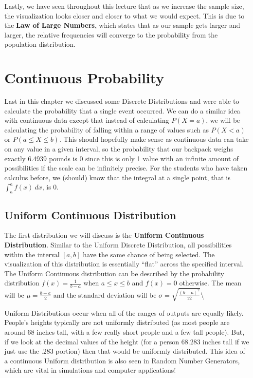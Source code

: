 \documentclass[
  letterpaper,
  DIV=11,
  numbers=noendperiod]{scrreprt}
\begin{document}
Lastly, we have seen throughout this lecture that as we increase the
sample size, the visualization looks closer and closer to what we would
expect. This is due to the \textbf{Law of Large Numbers}, which states
that as our sample gets larger and larger, the relative frequencies will
converge to the probability from the population distribution.

\section{Continuous Probability}\label{continuous-probability}

Last in this chapter we discussed some Discrete Distributions and were
able to calculate the probability that a single event occurred. We can
do a similar idea with continuous data except that instead of
calculating \(P(X=a)\), we will be calculating the probability of
falling within a range of values such as \(P(X<a)\) or
\(P(a\leq X \leq b)\). This should hopefully make sense as continuous
data can take on any value in a given interval, so the probability that
our backpack weighs exactly 6.4939 pounds is 0 since this is only 1
value with an infinite amount of possibilities if the scale can be
infinitely precise. For the students who have taken calculus before, we
(should) know that the integral at a single point, that is
\(\int_a^a f(x)\ dx\), is 0.

\subsection{Uniform Continuous
Distribution}\label{uniform-continuous-distribution}

The first distribution we will discuss is the \textbf{Uniform Continuous
Distribution}. Similar to the Uniform Discrete Distribution, all
possibilities within the interval \([a,b]\) have the same chance of
being selected. The visualization of this distribution is essentially
``flat'' across the specified interval. The Uniform Continuous
distribution can be described by the probability distribution
\(f(x)=\frac{1}{b-a}\) when \(a\leq x \leq b\) and \(f(x)=0\) otherwise.
The mean will be \(\mu=\frac{b+a}{2}\) and the standard deviation will
be \(\sigma = \sqrt{\frac{(b-a)^2}{12}}\)\textbackslash{}

Uniform Distributions occur when all of the ranges of outputs are
equally likely. People's heights typically are not uniformly distributed
(as most people are around 68 inches tall, with a few really short
people and a few tall people). But, if we look at the decimal values of
the height (for a person 68.283 inches tall if we just use the .283
portion) then that would be uniformly distributed. This idea of a
continuous Uniform distribution is also seen in Random Number
Generators, which are vital in simulations and computer applications!
\end{document}
